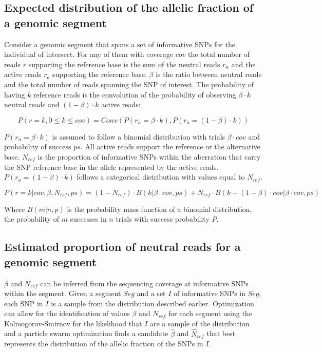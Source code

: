 	\subsection{Expected distribution of the allelic fraction of a genomic segment}
	Consider a genomic segment that spans a set of informative SNPs for the individual of intersect.
	For any of them with coverage $cov$ the total number of reads $r$ supporting the reference base is the sum of the neutral reads $r_n$ and the active reads $r_a$ supporting the reference base.
	$\beta$ is the ratio between neutral reads and the total number of reads spanning the SNP of interest.
	The probability of having $k$ reference reads is the convolution of the probability of observing $\beta\cdot k$ neutral reads and $(1-\beta)\cdot k$ active reads:

	$$P(r = k, 0\le k\le cov) = Conv(P(r_n = \beta\cdot k), P(r_a = (1-\beta)\cdot k))$$

	$P(r_n = \beta\cdot k)$ is assumed to follow a binomial distribution with trials $\beta\cdot cov$ and probability of success $ps$.
	All active reads support the reference or the alternative base.
	$N_{ref}$ is the proportion of informative SNPs within the aberration that carry the SNP reference base in the allele represented by the active reads.
	$P(r_a = (1-\beta)\cdot k)$ follows a categorical distribution with values equal to $N_{ref}$.

	$$P(r = k|cov, \beta, N_{ref}, ps) = (1-N_{ref})\cdot B(k|\beta\cdot cov, ps) + N_{ref}\cdot B(k-(1-\beta)\cdot cov | \beta\cdot cov, ps)$$

	Where $B(m|n, p)$ is the probability mass function of a binomial distribution, the probability of $m$ successes in $n$ trials with success probability $P$.

	\subsection{Estimated proportion of neutral reads for a genomic segment}
	$\beta$ and $N_{ref}$ can be inferred from the sequencing coverage at informative SNPs within the segment.
	Given a segment $Seg$ and a set $I$ of informative SNPs in $Seg$, each SNP in $I$ is a sample from the distribution described earlier.
	Optimization can allow for the identification of values $\beta$ and $N_{ref}$ for each segment using the Kolmogorov-Smirnov for the likelihood that $I$ are a sample of the distribution and a particle swarm optimization finds a candidate $\hat{\beta}$ and $\hat{N}_{ref}$ that best represents the distribution of the allelic fraction of the SNPs in $I$.

